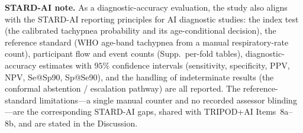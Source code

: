 \medskip
\noindent\textbf{STARD-AI note.} As a diagnostic-accuracy evaluation, the study also aligns with the
STARD-AI reporting principles for AI diagnostic studies: the index test (the calibrated tachypnea
probability and its age-conditional decision), the reference standard (WHO age-band tachypnea from a manual
respiratory-rate count), participant flow and event counts (Supp.~per-fold tables), diagnostic-accuracy
estimates with $95\%$ confidence intervals (sensitivity, specificity, PPV, NPV, Se@Sp90, Sp@Se90), and the
handling of indeterminate results (the conformal abstention / escalation pathway) are all reported. The
reference-standard limitations---a single manual counter and no recorded assessor blinding---are the
corresponding STARD-AI gaps, shared with TRIPOD+AI Items~8a--8b, and are stated in the Discussion.
